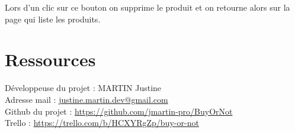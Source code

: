 \documentclass[report]{BetterDocument}
\begin{document}
	Lors d'un clic sur ce bouton on supprime le produit et on retourne alors sur la page qui liste les produits.

	\chapter{Ressources}

	\noindent Développeuse du projet : MARTIN Justine\\
	Adresse mail : \href{mailto:justine.martin.dev@gmail.com}{justine.martin.dev@gmail.com}\\
	Github du projet : \url{https://github.com/jmartin-pro/BuyOrNot}\\
	Trello : \url{https://trello.com/b/HCXYRgZp/buy-or-not}
\end{document}
